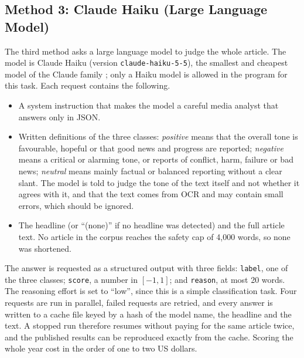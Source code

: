 \subsection{Method 3: Claude Haiku (Large Language Model)}
The third method asks a large language model to judge the whole article. The model is Claude Haiku (version \texttt{claude-haiku-5-5}), the smallest and cheapest model of the Claude family \cite{anthropic2026}; only a Haiku model is allowed in the program for this task. Each request contains the following.
\begin{itemize}
\item A system instruction that makes the model a careful media analyst that answers only in JSON.
\item Written definitions of the three classes: \emph{positive} means that the overall tone is favourable, hopeful or that good news and progress are reported; \emph{negative} means a critical or alarming tone, or reports of conflict, harm, failure or bad news; \emph{neutral} means mainly factual or balanced reporting without a clear slant. The model is told to judge the tone of the text itself and not whether it agrees with it, and that the text comes from OCR and may contain small errors, which should be ignored.
\item The headline (or ``(none)'' if no headline was detected) and the full article text. No article in the corpus reaches the safety cap of 4,000 words, so none was shortened.
\end{itemize}
The answer is requested as a structured output with three fields: \texttt{label}, one of the three classes; \texttt{score}, a number in $[-1,1]$; and \texttt{reason}, at most 20 words. The reasoning effort is set to ``low'', since this is a simple classification task. Four requests are run in parallel, failed requests are retried, and every answer is written to a cache file keyed by a hash of the model name, the headline and the text. A stopped run therefore resumes without paying for the same article twice, and the published results can be reproduced exactly from the cache. Scoring the whole year cost in the order of one to two US dollars.

